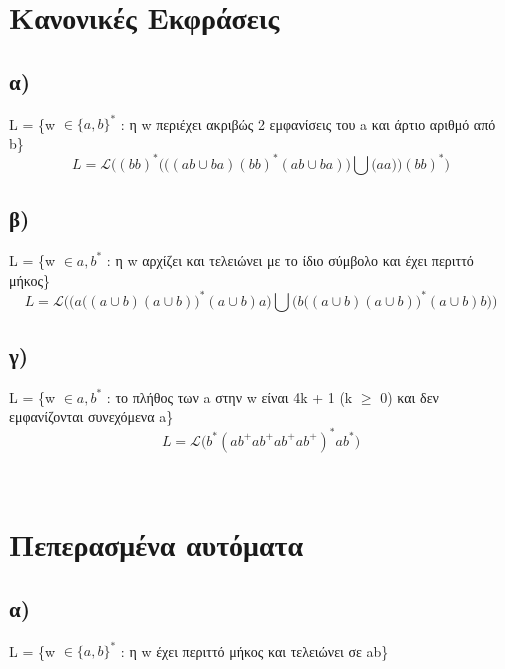 \section{Κανονικές Εκφράσεις}

\subsection[Ερώτημα α]{\textbf{α) }} L = \{w $\in \{a, b\}^*$ : η w περιέχει ακριβώς 2 εμφανίσεις του a και άρτιο αριθμό από b\}
\begin{equation*}
	L = \mathcal{L} \Bigg( (bb)^* \bigg( \Big( (ab \cup ba) (bb)^*(ab \cup ba) \Big)  \bigcup    \Big(aa\Big)  \bigg) (bb)^*\Bigg)
\end{equation*}

\subsection[Ερώτημα β]{\textbf{β) }} L = \{w $\in {a, b}^*$ : η w αρχίζει και τελειώνει με το ίδιο σύμβολο και έχει περιττό μήκος\}
\begin{equation*}
	L = \mathcal{L} \Bigg( \bigg(  a \Big( (a \cup b)(a \cup b) \Big)^* (a \cup b) a \bigg)  \bigcup   \bigg( b \Big( (a \cup b)(a \cup b) \Big)^* (a \cup b) b \bigg) \Bigg)
\end{equation*}

\subsection[Ερώτημα γ]{\textbf{γ) }} L = \{w $\in {a, b}^*$ : το πλήθος των a στην w είναι 4k + 1 (k $\geq$ 0) και δεν εμφανίζονται συνεχόμενα a\}
\begin{equation*}
	L = \mathcal{L} \bigg( b^*(a b^+a b^+a b^+a b^+)^*ab^* \bigg)
\end{equation*}

\noindent\\
\section{Πεπερασμένα αυτόματα}

\subsection[Ερώτημα α]{\textbf{α) }} L = \{w $\in \{a, b\}^*$ : η w έχει περιττό μήκος και τελειώνει σε ab\}
\newcommand\leftX{-1.5}
\newcommand\rightX{1.5}
\newcommand\topY{2}
\newcommand\midY{0}
\newcommand\bottomY{-2}

